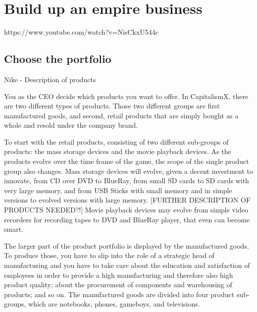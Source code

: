\documentclass[11pt,titlepage,oneside,openany]{book}
\begin{document}
 
 
%







\section{Build up an empire business}
\label{sec:business}
https://www.youtube.com/watch?v=NisCkxU544c
\subsection{Choose the portfolio}
\label{sub:portfolio}
Nike - Description of products 

You as the CEO decide which products you want to offer. In CapitalismX, there are two different types of products. Those two different groups are first manufactured goods, and second, retail products that are simply bought as a whole and resold under the company brand.

To start with the retail products, consisting of two different sub-groups of products: the mass storage devices and the movie playback devices. As the products evolve over the time frame of the game, the scope of the single product group also changes. Mass storage devices will evolve, given a decent investment to innovate, from CD over DVD to BlueRay, from small SD cards to SD cards with very large memory, and from USB Sticks with small memory and in simple versions to evolved versions with large memory. [FURTHER DESCRIPTION OF PRODUCTS NEEDED?!] Movie playback devices may evolve from simple video recorders for recording tapes to DVD and BlueRay player, that even can become smart. 

The larger part of the product portfolio is displayed by the manufactured goods. To produce those, you have to slip into the role of a strategic head of manufacturing and you have to take care about the education and satisfaction of employees in order to provide a high manufacturing and therefore also high product quality; about the procurement of components and warehousing of products; and so on.
The manufactured goods are divided into four product sub-groups, which are notebooks, phones, gameboys, and televisions. 
\end{document}
